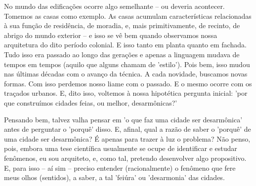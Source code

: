 \documentclass[]{report}
\begin{document}
	No mundo das edificações ocorre algo semelhante – ou deveria acontecer. Tomemos as casas como exemplo. As casas acumulam características relacionadas à sua função de residência, de moradia, e, mais primitivamente, de recinto, de abrigo do mundo exterior – e isso se vê bem quando observamos nossa arquitetura do dito período colonial. E isso tanto em planta quanto em fachada. Tudo isso era passado ao longo das gerações e apenas a linguagem mudava de tempos em tempos (aquilo que alguns chamam de 'estilo'). Pois bem, isso mudou nas últimas décadas com o avanço da técnica. A cada novidade, buscamos novas formas. Com isso perdemos nosso liame com o passado. E o mesmo ocorre com os traçados urbanos. E, dito isso, voltemos à nossa hipotética pergunta inicial: 'por que construímos cidades feias, ou melhor, desarmônicas?' 

	
	Pensando bem, talvez valha pensar em 'o que faz uma cidade ser desarmônica' antes de perguntar o 'porquê' disso. E, afinal, qual a razão de saber o 'porquê' de uma cidade ser desarmônica? É apenas para trazer à luz o problema? Não penso, pois, embora uma tese científica usualmente se ocupe de identificar e estudar fenômenos, eu sou arquiteto, e, como tal, pretendo desenvolver algo propositivo. E, para isso – aí sim – preciso entender (racionalmente) o fenômeno que fere meus olhos (sentidos), a saber, a tal 'feiúra' ou 'desarmonia' das cidades. 
	
\end{document}
